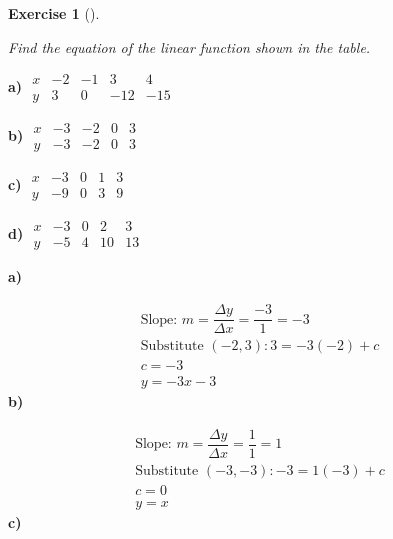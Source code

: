 \documentclass[
  letterpaper,
  DIV=11,
  numbers=noendperiod]{scrreprt}
\theoremstyle{definition}
\newtheorem{exercise}{Exercise}[chapter]
\theoremstyle{remark}
\begin{document}
\begin{exercise}[]\protect\hypertarget{exr-u7-3}{}\label{exr-u7-3}

\emph{Find the equation of the linear function shown in the table.}

\textbf{a)}
\(\displaystyle \begin{array}{c|cccc} x & -2 & -1 & 3 & 4 \\ \hline y & 3 & 0 & -12 & -15 \end{array}\)

\textbf{b)}
\(\displaystyle \begin{array}{c|cccc} x & -3 & -2 & 0 & 3 \\ \hline y & -3 & -2 & 0 & 3 \end{array}\)

\textbf{c)}
\(\displaystyle \begin{array}{c|cccc} x & -3 & 0 & 1 & 3 \\ \hline y & -9 & 0 & 3 & 9 \end{array}\)

\textbf{d)}
\(\displaystyle \begin{array}{c|cccc} x & -3 & 0 & 2 & 3 \\ \hline y & -5 & 4 & 10 & 13 \end{array}\)

\begin{tcolorbox}[enhanced jigsaw, opacitybacktitle=0.6, coltitle=black, arc=.35mm, colframe=quarto-callout-tip-color-frame, colback=white, bottomrule=.15mm, left=2mm, colbacktitle=quarto-callout-tip-color!10!white, titlerule=0mm, opacityback=0, title=\textcolor{quarto-callout-tip-color}{\faLightbulb}\hspace{0.5em}{🔍 View Solutions}, leftrule=.75mm, breakable, rightrule=.15mm, bottomtitle=1mm, toptitle=1mm, toprule=.15mm]

\textbf{a)}

\[
\begin{aligned}
\text{Slope: } m = \dfrac{\Delta y}{\Delta x} = \dfrac{-3}{1} = -3 \\[4pt] \text{Substitute } (-2, 3): 3 = -3(-2) + c \\[4pt] c = -3 \\[4pt] y = -3x - 3
\end{aligned}
\] \textbf{b)}

\[
\begin{aligned}
\text{Slope: } m = \dfrac{\Delta y}{\Delta x} = \dfrac{1}{1} = 1 \\[4pt] \text{Substitute } (-3, -3): -3 = 1(-3) + c \\[4pt] c = 0 \\[4pt] y = x
\end{aligned}
\] \textbf{c)}


\end{tcolorbox}
\end{exercise}
\end{document}
